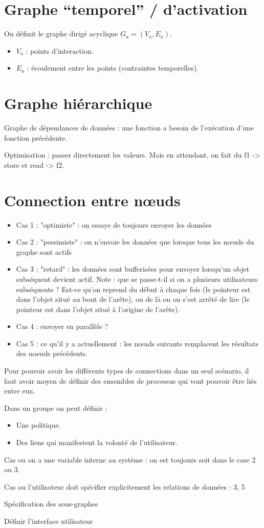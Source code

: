 \documentclass[french,a4paper]{article}
\begin{document}
\section{Graphe ``temporel'' / d'activation}
On définit le graphe dirigé acyclique $G_a=(V_a,E_a)$.
\begin{itemize}
    \item $V_a$ : points d'interaction.
    \item $E_a$ : écoulement entre les points (contraintes temporelles).
\end{itemize}

\section{Graphe hiérarchique}
Graphe de dépendances de données : une fonction a besoin de l'exécution d'une fonction précédente.

Optimisation : passer directement les valeurs. Mais en attendant, on fait du f1 -> store et read -> f2.

\section{Connection entre nœuds}
\begin{itemize}
\item Cas 1 : "optimiste" : on essaye de toujours envoyer les données
\item Cas 2 : "pessimiste" : on n'envoie les données que lorsque tous les nœuds du graphe sont actifs
\item Cas 3 : "retard" : les données sont bufferisées pour envoyer lorsqu'un objet subséquent devient actif. 
Note : que se passe-t-il si on a plusieurs utilisateurs subséquents ?
 Est-ce qu'on reprend du début à chaque fois (le pointeur est dans l'objet situé au bout de l'arête), ou de là ou on s'est arrêté de lire (le pointeur est dans l'objet situé à l'origine de l'arête).
\item Cas 4 : envoyer en parallèle ?
\item Cas 5 : ce qu'il y a actuellement : les nœuds suivants remplacent les résultats des noeuds précédents.
\end{itemize}

Pour pouvoir avoir les différents types de connections dans un seul scénario, il faut avoir moyen de définir des ensembles de processus qui vont pouvoir être liés entre eux.

Dans un groupe on peut définir : 
\begin{itemize}
    \item Une politique.
    \item Des liens qui manifestent la volonté de l'utilisateur.
\end{itemize}

Cas ou on a une variable interne au système : on est toujours soit dans le case 2 ou 3.

Cas ou l'utilisateur doit spécifier explicitement les relations de données : 3, 5

Spécification des sous-graphes

Définir l'interface utilisateur
\end{document}
